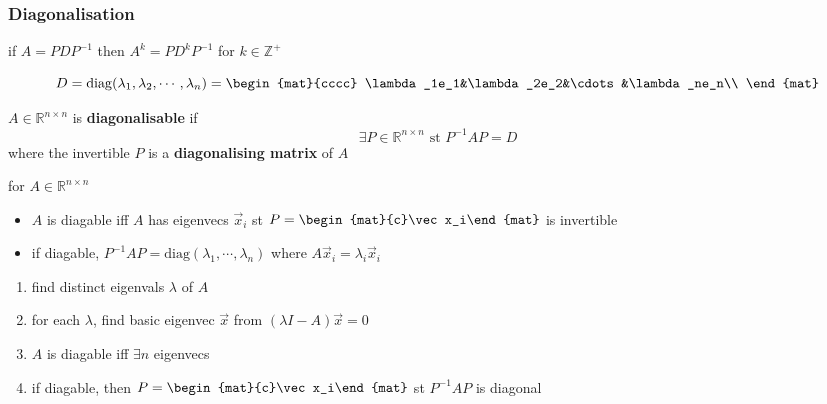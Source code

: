 		\subsubsection{Diagonalisation}
		    \begin{definition}
		        if $A=PDP^{-1}$ then $A^k=PD^kP^{-1}$ for $k\in\mathbb{Z}^+$
		    \end{definition}
		    \begin{definition}
		        $$D=\mathrm{diag}(\lambda_1,\lambda_2,\cdots,\lambda_n)=\begin{mat}{cccc} \lambda_1e_1&\lambda_2e_2&\cdots&\lambda_ne_n\\ \end{mat}$$
		    \end{definition}
			\begin{definition}
				$A\in\mathbb{R}^{n\times n}$ is \textbf{diagonalisable} if
				$$\exists P\in\mathbb{R}^{n\times n}\text{ st }P^{-1}AP=D$$
				where the invertible $P$ is a \textbf{diagonalising matrix} of $A$
			\end{definition}
			\begin{theorem}
			    for $A\in\mathbb{R}^{n\times n}$
				\begin{itemize}
					\item $A$ is diagable iff $A$ has eigenvecs $\vec x_i$ st $P=\begin{mat}{c}\vec x_i\end{mat}$ is invertible
					\item if diagable, $P^{-1}AP=\mathrm{diag}(\lambda_1,\cdots,\lambda_n)$ where $A\vec x_i=\lambda_i\vec x_i$
				\end{itemize}
			\end{theorem}
			\begin{algorithm}
				\begin{enumerate}
					\item find distinct eigenvals $\lambda$ of $A$
					\item for each $\lambda$, find basic eigenvec $\vec x$ from $(\lambda I-A)\vec x=0$
					\item $A$ is diagable iff $\exists n$ eigenvecs
					\item if diagable, then $P=\begin{mat}{c}\vec x_i\end{mat}$ st $P^{-1}AP$ is diagonal
				\end{enumerate}
			\end{algorithm}

